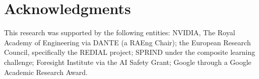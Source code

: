 
\section*{Acknowledgments}

This research was supported by the following entities: NVIDIA, The Royal Academy of Engineering via DANTE (a RAEng Chair); the European Research Council, specifically the REDIAL project; SPRIND under the composite learning challenge; Foresight Institute via the AI Safety Grant; Google through a Google Academic Research Award.